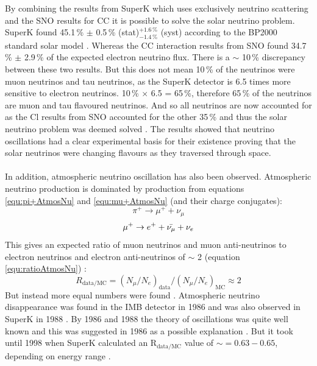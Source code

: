 \\\\By combining the results from SuperK which uses exclusively neutrino scattering and the SNO results for CC it is possible to solve the solar neutrino problem. SuperK found 45.1\,\% $\pm$ 0.5\,\% (stat)$^{+1.6\,\%}_{-1.4\,\%}$ (syst) according to the BP2000 standard solar model \cite{superK2001}. Whereas the CC interaction results from SNO found 34.7\,\% $\pm$ 2.9\,\% of the expected electron neutrino flux\cite{sno2001}. There is a $\sim$ 10\,\% discrepancy between these two results. But this does not mean 10\,\% of the neutrinos were muon neutrinos and tau neutrinos, as the SuperK detector is 6.5 times more sensitive to electron neutrinos. 10\,\% $\times$ 6.5 = 65\,\%, therefore 65\,\% of the neutrinos are muon and tau flavoured neutrinos. And so all neutrinos are now accounted for as the Cl results from SNO accounted for the other 35\,\% and thus the solar neutrino problem was deemed solved  \cite{griffiths2008neutrinoOscillations}. The results showed that neutrino oscillations had a clear experimental basis for their existence proving that the solar neutrinos were changing flavours as they traversed through space. 
\\\\In addition, atmospheric neutrino oscillation has also been observed. Atmospheric neutrino production is dominated by production from equations \ref{equ:pi+AtmosNu} and \ref{equ:mu+AtmosNu} (and their charge conjugates):
\begin{equation}
    \pi^+ \rightarrow \mu^+ + \nu_\mu
    \label{equ:pi+AtmosNu}
\end{equation}
\begin{equation}
    \mu^+ \rightarrow e^+ + \Bar{\nu_\mu} + \nu_e
    \label{equ:mu+AtmosNu}
\end{equation}
This gives an expected ratio of muon neutrinos and muon anti-neutrinos to electron neutrinos and electron anti-neutrinos of $\sim$ 2 (equation \ref{equ:ratioAtmosNu}) \cite{fukuda_skAtmosAnnounce_1998}:
\begin{equation}
    R_{\textrm{data}/\textrm{MC}} = (N_\mu/N_e)_{\textrm{data}}/(N_\mu/N_e)_{\textrm{MC}} \approx 2
    \label{equ:ratioAtmosNu}
\end{equation}
But instead more equal numbers were found \cite{fukuda_skAtmosAnnounce_1998} \cite{KAJITA_sk_atmospheric_2016}. Atmospheric neutrino disappearance was found in the IMB detector in 1986 \cite{tjHaines_AtmosModel_1986} and was also observed in SuperK in 1988 \cite{Hirata_sk_atmosStudy_1988} \cite{KAJITA_sk_atmospheric_2016}. By 1986 and 1988 the theory of oscillations was quite well known and this was suggested in 1986 as a possible explanation \cite{tjHaines_AtmosModel_1986}. But it took until 1998 when SuperK calculated an R$_{\textrm{data}/\textrm{MC}}$ value of $\sim = 0.63 - 0.65$, depending on energy range \cite{fukuda_skAtmosAnnounce_1998}. 
